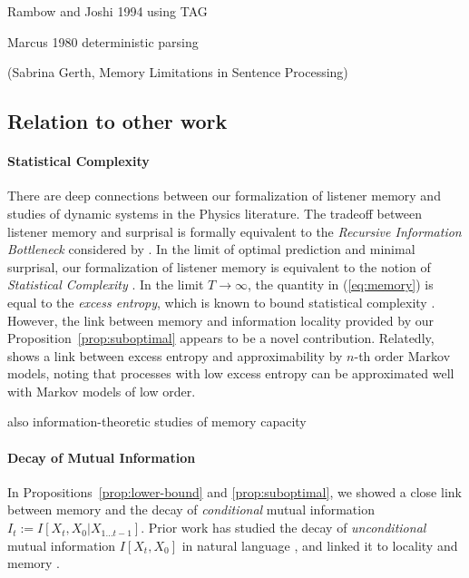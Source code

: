 \documentclass[11pt,letterpaper]{article}
\begin{document}
Rambow and Joshi 1994 using TAG

Marcus 1980 deterministic parsing

(Sabrina Gerth, Memory Limitations in Sentence Processing)


\subsection{Relation to other work}

\paragraph{Statistical Complexity}
There are deep connections between our formalization of listener memory and studies of dynamic systems in the Physics literature.
The tradeoff between listener memory and surprisal is formally equivalent to the \emph{Recursive Information Bottleneck} considered by \cite{still-information-2014}.
In the limit of optimal prediction and minimal surprisal, our formalization of listener memory is equivalent to the notion of \emph{Statistical Complexity} \citep{crutchfield-inferring-1989}.
In the limit $T \rightarrow \infty$, the quantity in (\ref{eq:memory}) is equal to the \emph{excess entropy}, which is known to bound statistical complexity \citep{crutchfield-inferring-1989}.
However, the link between memory and information locality provided by our Proposition~\ref{prop:suboptimal} appears to be a novel contribution.
Relatedly, \cite{sharan-prediction-2016} shows a link between excess entropy and approximability by $n$-th order Markov models, noting that processes with low excess entropy can be approximated well with Markov models of low order.

also information-theoretic studies of memory capacity

\paragraph{Decay of Mutual Information}
In Propositions~\ref{prop:lower-bound} and \ref{prop:suboptimal}, we showed a close link between memory and the decay of \emph{conditional} mutual information $I_t := I[X_t, X_0 | X_{1\dots t-1}]$.
Prior work has studied the decay of \emph{unconditional} mutual information $I[X_t, X_0]$ in natural language \citep{ebeling-entropy-1994,lin-critical-2017}, and linked it to locality and memory \citep{futrell-noisy-context-2017}.
\end{document}
